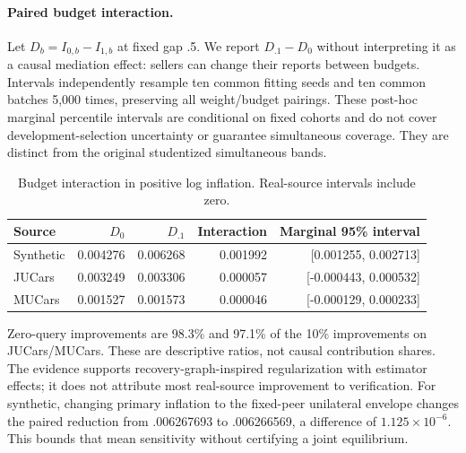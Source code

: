 \documentclass[11pt]{article}
\begin{document}
\paragraph{Paired budget interaction.}
Let $D_b=I_{0,b}-I_{1,b}$ at fixed gap .5. We report $D_{.1}-D_0$ without
interpreting it as a causal mediation effect: sellers can change their reports
between budgets. Intervals independently resample ten common fitting seeds
and ten common batches 5,000 times, preserving all weight/budget pairings.
These post-hoc marginal percentile intervals are conditional on fixed cohorts
and do not cover development-selection uncertainty or guarantee simultaneous
coverage. They are distinct from the original studentized simultaneous bands.
\begin{table}[htbp]\centering\small
\caption{Budget interaction in positive log inflation. Real-source intervals include zero.}
\begin{tabular}{lrrrr}\toprule
Source & $D_0$ & $D_{.1}$ & Interaction & Marginal 95\% interval\\\midrule
Synthetic & 0.004276 & 0.006268 & 0.001992 & [0.001255, 0.002713]\\
JUCars & 0.003249 & 0.003306 & 0.000057 & [-0.000443, 0.000532]\\
MUCars & 0.001527 & 0.001573 & 0.000046 & [-0.000129, 0.000233]\\
\bottomrule\end{tabular}\end{table}
Zero-query improvements are 98.3\% and 97.1\% of the 10\% improvements on
JUCars/MUCars. These are descriptive ratios, not causal contribution shares.
The evidence supports recovery-graph-inspired regularization with estimator
effects; it does not attribute most real-source improvement to verification.
For synthetic, changing primary inflation to the fixed-peer unilateral
envelope changes the paired reduction from .006267693 to .006266569, a
difference of $1.125\times10^{-6}$. This bounds that mean sensitivity without
certifying a joint equilibrium.
\end{document}

